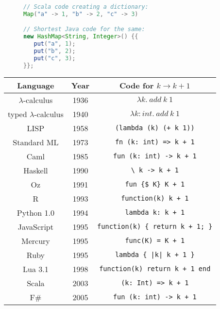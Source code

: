 \begin{wrapfigure}{l}{0.38\columnwidth}%
\vspace{-0.7\baselineskip}
\begin{lstlisting}[language=Java]
// Scala code creating a dictionary:
Map("a" -> 1, "b" -> 2, "c" -> 3)

// Shortest Java code for the same:
new HashMap<String, Integer>() {{
   put("a", 1);
   put("b", 2);
   put("c", 3);
}};
\end{lstlisting}

\vspace{0\baselineskip}
\end{wrapfigure}%
\begin{wraptable}{r}{0.6\columnwidth}%
\begin{centering}
\vspace{-8\baselineskip}
\begin{tabular}{|c|c|c|}
\hline 
\textbf{Language} & \textbf{Year} & \textbf{Code for }$k\rightarrow k+1$\tabularnewline
\hline 
\hline 
{\footnotesize{}$\lambda$-calculus} & {\footnotesize{}1936} & $\lambda k.~add~k~1$\tabularnewline
\hline 
{\footnotesize{}typed $\lambda$-calculus} & {\footnotesize{}1940} & $\lambda k:int.~add~k~1$\tabularnewline
\hline 
{\footnotesize{}LISP} & {\footnotesize{}1958} & \texttt{\footnotesize{}}\lstinline!(lambda (k) (+ k 1))!\tabularnewline
\hline 
{\footnotesize{}Standard ML} & {\footnotesize{}1973} & \texttt{\footnotesize{}}\lstinline!fn (k: int) => k + 1!\tabularnewline
\hline 
{\footnotesize{}Caml} & {\footnotesize{}1985} & \lstinline!fun (k: int) -> k + 1!\tabularnewline
\hline 
{\footnotesize{}Haskell} & {\footnotesize{}1990} & \lstinline!\ k -> k + 1!\tabularnewline
\hline 
{\footnotesize{}Oz} & {\footnotesize{}1991} & \lstinline!fun {$ K} K + 1!\tabularnewline
\hline 
{\footnotesize{}R} & {\footnotesize{}1993} & \lstinline!function(k) k + 1!\tabularnewline
\hline 
{\footnotesize{}Python 1.0} & {\footnotesize{}1994} & \lstinline!lambda k: k + 1!\tabularnewline
\hline 
{\footnotesize{}JavaScript} & {\footnotesize{}1995} & \lstinline!function(k) { return k + 1; }!\tabularnewline
\hline 
{\footnotesize{}Mercury} & {\footnotesize{}1995} & \lstinline!func(K) = K + 1!\tabularnewline
\hline 
{\footnotesize{}Ruby} & {\footnotesize{}1995} & \lstinline!lambda { |k| k + 1 }!\tabularnewline
\hline 
{\footnotesize{}Lua 3.1} & {\footnotesize{}1998} & \lstinline!function(k) return k + 1 end!\tabularnewline
\hline 
{\footnotesize{}Scala} & {\footnotesize{}2003} & \lstinline!(k: Int) => k + 1!\tabularnewline
\hline 
{\footnotesize{}F\#} & {\footnotesize{}2005} & \lstinline!fun (k: int) -> k + 1!\tabularnewline

\end{tabular}
\end{centering}
\end{wraptable}
